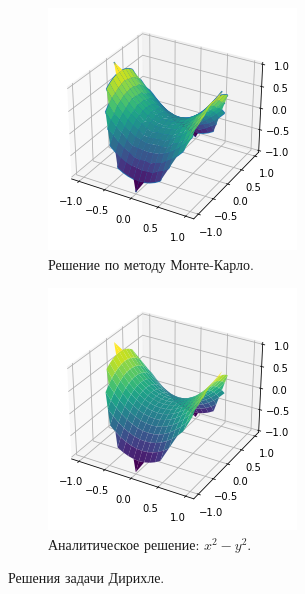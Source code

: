 \begin{figure}[ht]
    \centering
    \begin{subfigure}[b]{0.45\textwidth}
        \centering
        \includegraphics[width=\textwidth]{./resources/boundary_problem_emp.png}
        \caption{Решение по методу Монте-Карло.}
        \label{subfig:boundary_emp}
    \end{subfigure}
    \hfill
    \begin{subfigure}[b]{0.45\textwidth}
        \centering
        \includegraphics[width=\textwidth]{./resources/boundary_problem_an.png}
        \caption{Аналитическое решение: $ x^2 - y^2. $}
        \label{subfig:boundary_an}
    \end{subfigure}
    \caption{Решения задачи Дирихле.}
    \label{fig:boundary_solutions}
\end{figure}